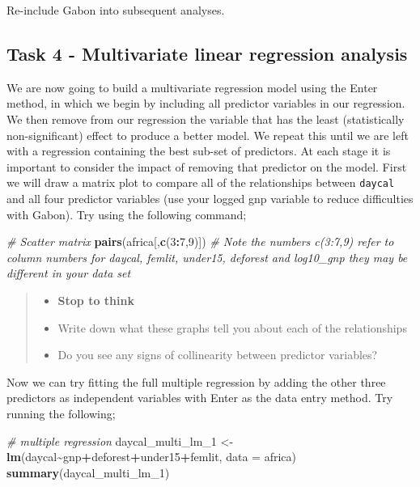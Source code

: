 \documentclass[
]{book}
\newenvironment{Shaded}{\begin{snugshade}}{\end{snugshade}}
\newcommand{\AttributeTok}[1]{\textcolor[rgb]{0.13,0.29,0.53}{#1}}
\newcommand{\CommentTok}[1]{\textcolor[rgb]{0.56,0.35,0.01}{\textit{#1}}}
\newcommand{\DecValTok}[1]{\textcolor[rgb]{0.00,0.00,0.81}{#1}}
\newcommand{\FunctionTok}[1]{\textcolor[rgb]{0.13,0.29,0.53}{\textbf{#1}}}
\newcommand{\NormalTok}[1]{#1}
\newcommand{\OtherTok}[1]{\textcolor[rgb]{0.56,0.35,0.01}{#1}}
\newcommand{\SpecialCharTok}[1]{\textcolor[rgb]{0.81,0.36,0.00}{\textbf{#1}}}
\providecommand{\tightlist}{%
  \setlength{\itemsep}{0pt}\setlength{\parskip}{0pt}}
\begin{document}
Re-include Gabon into subsequent analyses.

\subsection{Task 4 - Multivariate linear regression analysis}\label{c11t4}

We are now going to build a multivariate regression model using the Enter method, in which we begin by including all predictor variables in our regression. We then remove from our regression the variable that has the least (statistically non-significant) effect to produce a better model. We repeat this until we are left with a regression containing the best sub-set of predictors. At each stage it is important to consider the impact of removing that predictor on the model.
First we will draw a matrix plot to compare all of the relationships between \texttt{daycal} and all four predictor variables (use your logged gnp variable to reduce difficulties with Gabon). Try using the following command;

\begin{Shaded}
\begin{Highlighting}[]
\CommentTok{\# Scatter matrix}
\FunctionTok{pairs}\NormalTok{(africa[,}\FunctionTok{c}\NormalTok{(}\DecValTok{3}\SpecialCharTok{:}\DecValTok{7}\NormalTok{,}\DecValTok{9}\NormalTok{)])}
\CommentTok{\# Note the numbers c(3:7,9) refer to column numbers for daycal, femlit, under15, deforest and log10\_gnp they may be different in your data set}
\end{Highlighting}
\end{Shaded}

\begin{quote}
\begin{itemize}
\tightlist
\item
  \textbf{Stop to think}
\item
  Write down what these graphs tell you about each of the relationships
\item
  Do you see any signs of collinearity between predictor variables?
\end{itemize}
\end{quote}

Now we can try fitting the full multiple regression by adding the other three predictors as independent variables with Enter as the data entry method. Try running the following;

\begin{Shaded}
\begin{Highlighting}[]
\CommentTok{\# multiple regression}
\NormalTok{daycal\_multi\_lm\_1 }\OtherTok{\textless{}{-}} \FunctionTok{lm}\NormalTok{(daycal}\SpecialCharTok{\textasciitilde{}}\NormalTok{gnp}\SpecialCharTok{+}\NormalTok{deforest}\SpecialCharTok{+}\NormalTok{under15}\SpecialCharTok{+}\NormalTok{femlit, }\AttributeTok{data =}\NormalTok{ africa)}
\FunctionTok{summary}\NormalTok{(daycal\_multi\_lm\_1)}
\end{Highlighting}
\end{Shaded}
\end{document}
